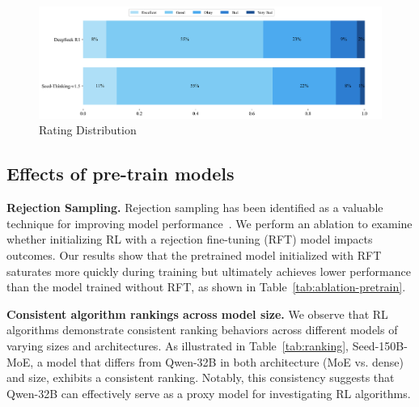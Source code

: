 \begin{figure}[H]
    \includegraphics[width=1.0\textwidth]{figures/gsb.png}
    \caption{Rating Distribution}
    \label{fig:rating_distribution}
\end{figure}


\subsection{Effects of pre-train models}

\textbf{Rejection Sampling.} Rejection sampling has been identified as a valuable technique for improving model performance~\cite{r1}. We perform an ablation to examine whether initializing RL with a rejection fine-tuning (RFT) model impacts outcomes. Our results show that the pretrained model initialized with RFT saturates more quickly during training but ultimately achieves lower performance than the model trained without RFT, as shown in Table~\ref{tab:ablation-pretrain}.

\textbf{Consistent algorithm rankings across model size.} We observe that RL algorithms demonstrate consistent ranking behaviors across different models of varying sizes and architectures. As illustrated in Table~\ref{tab:ranking}, Seed-150B-MoE, a model that differs from Qwen-32B in both architecture (MoE vs. dense) and size, exhibits a consistent ranking. Notably, this consistency suggests that Qwen-32B can effectively serve as a proxy model for investigating RL algorithms.


